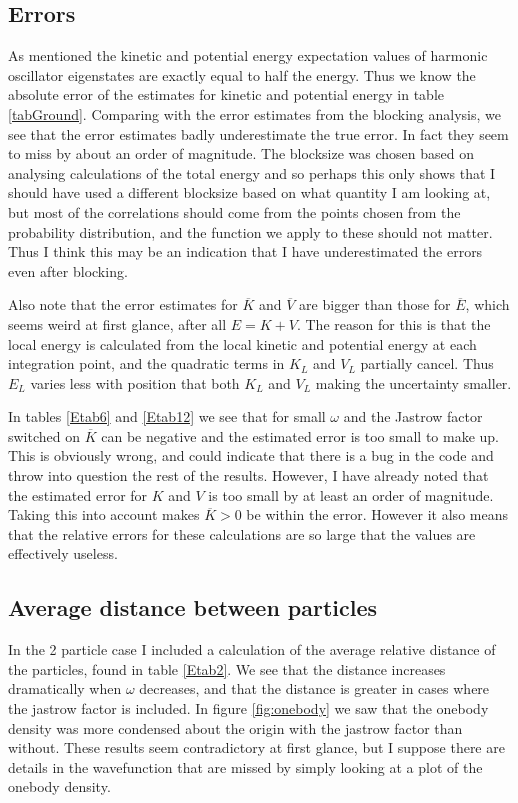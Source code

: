 \documentclass[a4paper,English,10pt]{article}
\renewcommand{\bar}{\overline}
\begin{document}
\subsection{Errors}
As mentioned the kinetic and potential energy expectation values of harmonic oscillator eigenstates are exactly equal to half the energy.
Thus we know the absolute error of the estimates for kinetic and potential energy in table \ref{tabGround}. Comparing with the error estimates from the blocking analysis,
we see that the error estimates badly underestimate the true error. In fact they seem to miss by about an order of magnitude. The blocksize was chosen based on analysing calculations
of the total energy and so perhaps this only shows that I should have used a different blocksize based on what quantity I am looking at, but most of the correlations
should come from the points chosen from the probability distribution, and the function we apply to these should not matter. Thus I think this may be an indication that I have
underestimated the errors even after blocking.

Also note that the error estimates for $\bar{K}$ and $\bar{V}$ are bigger than those for $\bar{E}$, which seems weird at first glance, after all $E = K + V$.
The reason for this is that the local energy is calculated from the local kinetic and potential energy at each integration point, and the quadratic terms in $K_L$
and $V_L$ partially cancel. Thus $E_L$ varies less with position that both $K_L$ and $V_L$ making the uncertainty smaller.

In tables \ref{Etab6} and \ref{Etab12} we see that for small $\omega$ and the Jastrow factor switched on $\bar{K}$ can be negative and the estimated error is too small to make up.
This is obviously wrong, and could indicate that there is a bug in the code and throw into question the rest of the results. However, I have already noted that the estimated error
for $K$ and $V$ is too small by at least an order of magnitude. Taking this into account makes $\bar{K} > 0$ be within the error. However it also means that the relative errors
for these calculations are so large that the values are effectively useless.

\subsection{Average distance between particles}
In the 2 particle case I included a calculation of the average relative distance of the particles, found in table \ref{Etab2}.
We see that the distance increases dramatically when $\omega$ decreases, and that the distance is greater in cases where the jastrow factor is included.
In figure \ref{fig:onebody} we saw that the onebody density was more condensed about the origin with the jastrow factor than without. These results seem
contradictory at first glance, but I suppose there are details in the wavefunction that are missed by simply looking at a plot of the onebody density.
\end{document}
